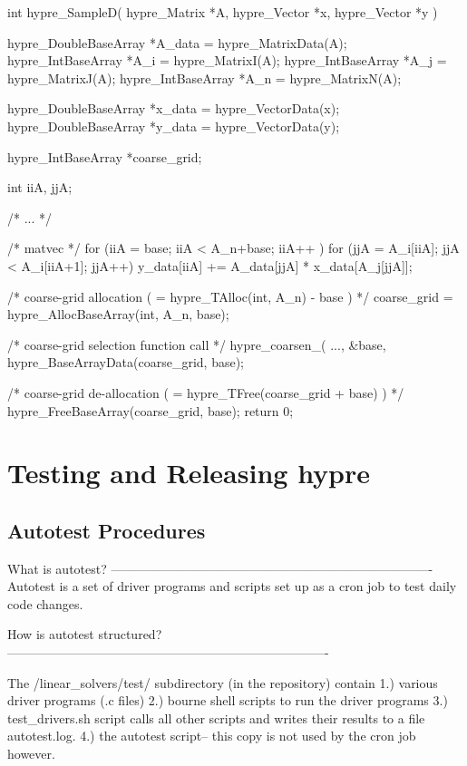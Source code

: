 int
hypre_SampleD( hypre_Matrix *A,
               hypre_Vector *x,
               hypre_Vector *y )
{
   hypre_DoubleBaseArray  *A_data = hypre_MatrixData(A);
   hypre_IntBaseArray     *A_i    = hypre_MatrixI(A);
   hypre_IntBaseArray     *A_j    = hypre_MatrixJ(A);
   hypre_IntBaseArray     *A_n    = hypre_MatrixN(A);

   hypre_DoubleBaseArray  *x_data = hypre_VectorData(x);
   hypre_DoubleBaseArray  *y_data = hypre_VectorData(y);

   hypre_IntBaseArray     *coarse_grid;

   int                     iiA, jjA;

   /* ... */

   /* matvec */
   for (iiA = base; iiA < A_n+base; iiA++ )
   {
      for (jjA = A_i[iiA]; jjA < A_i[iiA+1]; jjA++)
      {
         y_data[iiA] += A_data[jjA] * x_data[A_j[jjA]];
      }
   }

   /* coarse-grid allocation ( = hypre_TAlloc(int, A_n) - base ) */
   coarse_grid = hypre_AllocBaseArray(int, A_n, base);

   /* coarse-grid selection function call */
   hypre_coarsen_( ..., &base,
                   hypre_BaseArrayData(coarse_grid, base);

   /* coarse-grid de-allocation ( = hypre_TFree(coarse_grid + base) ) */
   hypre_FreeBaseArray(coarse_grid, base);
   return 0;
}

\section{Testing and Releasing hypre}

\subsection{Autotest Procedures}
What is autotest?
\newline
----------------------------------------------------------------------------
\newline
Autotest is a set of driver programs and scripts set up as a cron job to test daily code changes.

How is autotest structured?
\newline
----------------------------------------------------------------------------

\newline
The /linear_solvers/test/ subdirectory (in the repository) contain
1.) various driver programs (.c files)
2.) bourne shell scripts to run the driver programs
3.) test_drivers.sh script calls all other scripts and writes their results to a file autotest.log.
4.) the autotest script-- this copy is not used by the cron job however.

